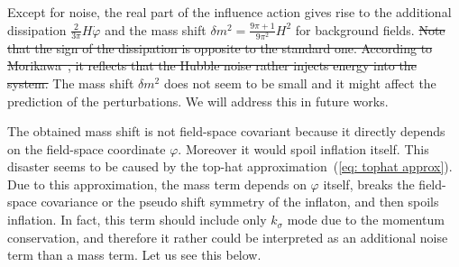 \documentclass[aps, prd
, preprint
, nofootinbib 
]{revtex4-1}
\begin{document}
Except for noise, the real part of the influence action gives rise to the additional dissipation $\frac{2}{3\pi}H\dot{\varphi}$ and
the mass shift $\delta m^2=\frac{9\pi+1}{9\pi^2}H^2$ for background fields. \sout{Note that the sign of the dissipation is opposite to the standard one.
According to Morikawa~\cite{Morikawa:1989xz}, it reflects that the Hubble noise rather injects energy into the system.}
The mass shift $\delta m^2$ does not seem to be small and it might affect the prediction of the perturbations. We will address this in future works.

\bigskip
The obtained mass shift is not field-space covariant because it directly depends on the field-space coordinate $\varphi$.
Moreover it would spoil inflation itself.
This disaster seems to be caused by the top-hat approximation~(\ref{eq: tophat approx}).
Due to this approximation, the mass term depends on $\varphi$ itself, breaks the field-space covariance or the pseudo shift symmetry
of the inflaton, and then spoils inflation.
In fact, this term should include only $k_\sigma$ mode due to the momentum conservation,
and therefore it rather could be interpreted as an additional noise term than a mass term.
Let us see this below.
\end{document}
